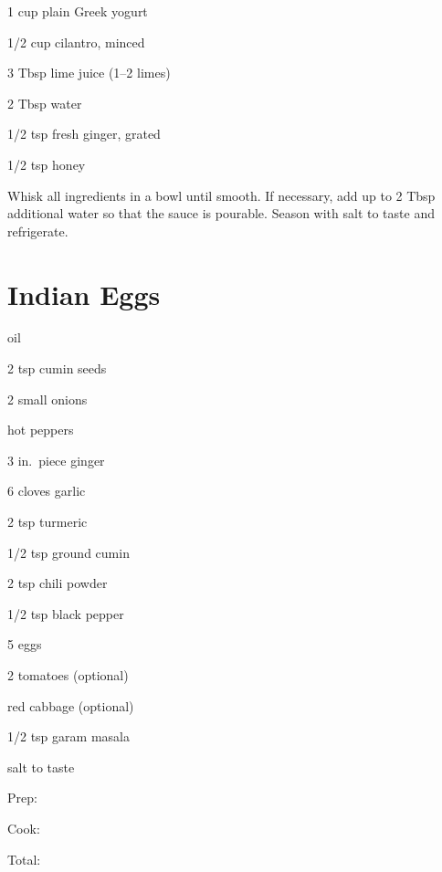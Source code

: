 \documentclass[oneside]{book}  %
\def\thisrecipe{}  %
\newcommand{\recipe}[1]{\section{#1}\def\thisrecipe{: #1}} %
\newcommand{\itemNL}{\item[] \hspace{-\labelsep}}  %
\begin{document}
\smallskip

\begin{twocols}
  \begin{ingredients}
    \item[1 cup] plain Greek yogurt
    \item[1/2 cup] cilantro, minced
    \item[3 Tbsp] lime juice (1--2 limes)
    \item[2 Tbsp] water
    \item[1/2 tsp] fresh ginger, grated
    \item[1/2 tsp] honey
  \end{ingredients}

  \columnbreak

  \begin{directions1col}
  \item Whisk all ingredients in a bowl until smooth. If necessary, add up to 2
    Tbsp additional water so that the sauce is pourable. Season with salt to
    taste and refrigerate.
  \end{directions1col}
\end{twocols}
\recipe{Indian Eggs} \label{recipe:indian_eggs} %

\begin{IT}
  \begin{ingredients}
    \itemNL oil
    \item[2 tsp] cumin seeds
    \item[2 small] onions
    \itemNL hot peppers
    \item[3 in.\ piece] ginger
    \item[6 cloves] garlic
    \item[2 tsp] turmeric
    \item[1/2 tsp] ground cumin
    \item[2 tsp] chili powder
    \item[1/2 tsp] black pepper
    \item[5] eggs
    \item[2] tomatoes (optional)
    \itemNL red cabbage (optional)
    \item[1/2 tsp] garam masala
    \itemNL salt to taste
  \end{ingredients}

  \switchcolumn

  \begin{timeline}
    \item[Prep:]  \todo
    \item[Cook:]  \todo
    \item[Total:] \todo
  \end{timeline}
\end{IT}
\end{document}
